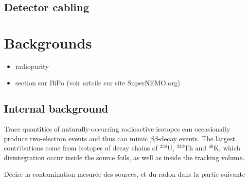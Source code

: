 \subsection{Detector cabling}

\section{Backgrounds}
\label{sec:SNbkg}

\begin{itemize}
\item radiopurity
\item section sur BiPo (voir artcile sur site SuperNEMO.org)
\end{itemize}

\subsection{Internal background}
\label{subsec:SNbkg_internal}

Trace quantities of naturally-occurring radioactive isotopes can occasionally produce two-electron events and thus can mimic $\beta\beta$-decay events.
The largest contributions come from isotopes of decay chains of $^{238}$U, $^{232}$Th and $^{40}$K, which disintegration occur inside the source foils, as well as inside the tracking volume.

Décire la contamination mesurée des sources, et du radon dans la partie suivante

